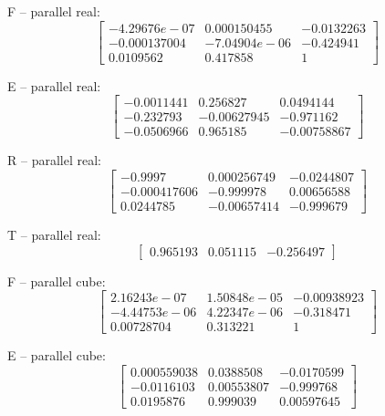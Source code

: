 F -- parallel real: 
\begin{equation*}
\begin{bmatrix}
-4.29676e-07 & 0.000150455 & -0.0132263 \\ -0.000137004 & -7.04904e-06 & -0.424941 \\ 0.0109562 & 0.417858 & 1
\end{bmatrix}
\end{equation*}

E -- parallel real: 
\begin{equation*}
\begin{bmatrix}
-0.0011441 & 0.256827 & 0.0494144 \\ -0.232793 & -0.00627945 & -0.971162 \\ -0.0506966 & 0.965185 & -0.00758867
\end{bmatrix}
\end{equation*}

R -- parallel real: 
\begin{equation*}
\begin{bmatrix}
-0.9997 & 0.000256749 & -0.0244807 \\ -0.000417606 & -0.999978 & 0.00656588 \\ 0.0244785 & -0.00657414 & -0.999679
\end{bmatrix}
\end{equation*}

T -- parallel real: 
\begin{equation*}
\begin{bmatrix}
0.965193 & 0.051115 & -0.256497
\end{bmatrix}
\end{equation*}

F -- parallel cube: 
\begin{equation*}
\begin{bmatrix}
2.16243e-07 & 1.50848e-05 & -0.00938923 \\ -4.44753e-06 & 4.22347e-06 & -0.318471 \\ 0.00728704 & 0.313221 & 1
\end{bmatrix}
\end{equation*}

E -- parallel cube: 
\begin{equation*}
\begin{bmatrix}
0.000559038 & 0.0388508 & -0.0170599 \\ -0.0116103 & 0.00553807 & -0.999768 \\ 0.0195876 & 0.999039 & 0.00597645
\end{bmatrix}
\end{equation*}

